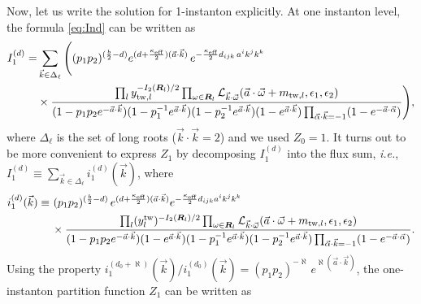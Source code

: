 \documentclass[letterpaper, 11pt]{article}
\def\CL{{\cal L}}
\def\a{\alpha}
\def\e{\epsilon}
\def\k{\kappa}
\def\w{\omega}
\begin{document}
 
Now, let us write the solution for 1-instanton explicitly. At one instanton level, the formula \eqref{eq:Ind} can be written as
 \begin{align}
  \begin{split}   \label{eq:1inst-i}
  I_1^{(d)} = &\sum_{\vec{k} \in \Delta_\ell}  \Bigg( 
     (p_1p_2)^{(\frac{b}{2}-d ) } e^{(d+\frac{\k_\text{eff}}{2})(\vec{a}\cdot\vec{k})}\,
    e^{-\frac{\k_\text{eff}}{2}d_{ijk}\,a^ik^jk^k}  \\& 
  \times \frac{\prod_{l} y_{\text{tw},l}^{-I_2(\boldsymbol{R}_l)/2} \prod_{\w \in \boldsymbol{R}_l} \CL_{\vec{k}\cdot\vec{\w}}(\vec{a}\cdot \vec{\w} + m_{\text{tw},l}, \e_1,\e_2)}{ (1-p_1p_2 e^{-\vec{a} \cdot \vec{k} })(1-p_1^{-1} e^{\vec{a} \cdot \vec{k} })(1-p_2^{-1} e^{\vec{a} \cdot \vec{k} })(1-e^{\vec{a} \cdot \vec{k} })\prod_{\vec{\a} \cdot \vec{k} = -1}(1-e^{-\vec{a}\cdot\vec{\alpha}})}
    \Bigg) , 
  \end{split}
\end{align}
where $\Delta_\ell$ is the set of long roots ($\vec{k}\cdot \vec{k} = 2$) and we used $Z_0 = 1$. 
It turns out to be more convenient to express $Z_1$ by decomposing $I_1^{(d)}$ into the flux sum, \emph{i.e.}, $I_1^{(d)} \equiv \sum_{\vec{k}\in\Delta_{\ell}} i_1^{(d)}(\vec{k})$, where
\begin{align}
  \label{eq:1inst-i-flux}
  \begin{split}
  i_{1}^{(d)}(\vec{k})\equiv &\ (p_1p_2)^{(\frac{b}{2}-d)}\,e^{(d+\frac{\kappa_{\text{eff}}}{2})(\vec{a}\cdot\vec{k})}e^{-\frac{\kappa_{\text{eff}}}{2}d_{ijk}a^ik^jk^k}\\
  &\,\times\frac{\prod_{l}(y_{l}^{\text{tw}})^{-{I_2(\boldsymbol{R}_l)}/{2}}\prod_{\w \in \boldsymbol{R}_l} \CL_{\vec{k}\cdot\vec{\w}}(\vec{a}\cdot \vec{\w} + m_{\text{tw},l}, \e_1,\e_2)}{(1-p_1p_2e^{-\vec{a}\cdot\vec{k}})(1-e^{\vec{a}\cdot\vec{k}})(1-p_1^{-1}e^{\vec{a}\cdot\vec{k}})(1-p_2^{-1}e^{\vec{a}\cdot\vec{k}})\prod_{\vec{\alpha}\cdot \vec{k}=-1}(1-e^{-\vec{a}\cdot\vec{\alpha}})}.
  \end{split}
\end{align}
Using the property $i_{1}^{(d_0+\aleph)}(\vec{k}) /i_{1}^{(d_0)}(\vec{k})=(p_1p_2)^{-\aleph}\,e^{\aleph(\vec{a}\cdot\vec{k})}$, the one-instanton partition function $Z_1$ can be written as
\end{document}
